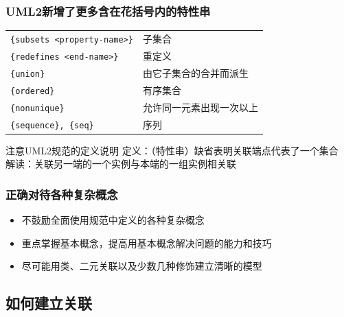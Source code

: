 \documentclass[compress]{beamer}
\begin{document}
\begin{frame}[fragile]
  \frametitle{UML2新增了更多含在花括号内的特性串}
  \begin{tabular}{ll}
    \verb~{subsets <property-name>}~ &  子集合 \\
    \verb~{redefines <end-name>}~ &  重定义 \\
    \verb~{union}~  & 由它子集合的合并而派生 \\
    \verb~{ordered}~ &  有序集合 \\
    \verb~{nonunique}~ & 允许同一元素出现一次以上 \\
    \verb~{sequence}, {seq}~  & 序列 \\
  \end{tabular}
  \begin{alertblock}{注意UML2规范的定义说明}
    定义：（特性串）缺省表明关联端点代表了一个集合 \\
    解读：关联另一端的一个实例与本端的一组实例相关联
  \end{alertblock}
\end{frame}

\begin{frame}
  \frametitle{正确对待各种复杂概念}
  \begin{itemize}
    \item 不鼓励全面使用规范中定义的各种复杂概念
    \item 重点掌握基本概念，提高用基本概念解决问题的能力和技巧
    \item 尽可能用类、二元关联以及少数几种修饰建立清晰的模型
  \end{itemize}
  \vspace*{2ex}
  \pause
  \centering{}

\end{frame}

\subsection{如何建立关联}
\end{document}
